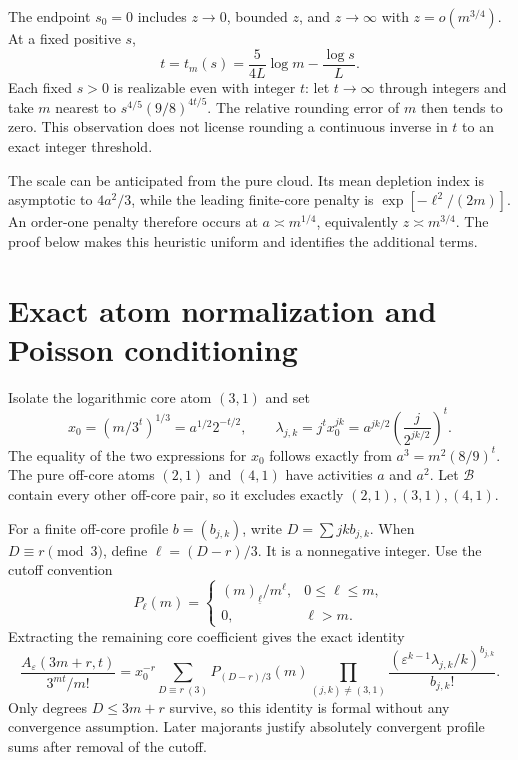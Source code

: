 \documentclass[11pt,letterpaper]{article}
\numberwithin{equation}{section}
\theoremstyle{definition}\newtheorem{definition}[theorem]{Definition}
\theoremstyle{remark}\newtheorem{remark}[theorem]{Remark}
\newcommand{\fall}[2]{(#1)_{\underline{#2}}}
\newcommand{\eps}{\varepsilon}
\newcommand{\Bad}{\mathcal B}
\begin{document}
The endpoint $s_0=0$ includes $z\to0$, bounded $z$, and $z\to\infty$
with $z=o(m^{3/4})$. At a fixed positive $s$,
\begin{equation}\label{det:grow:eq:t-of-s}
 t=t_m(s)=\frac{5}{4L}\log m-\frac{\log s}{L}.
\end{equation}
Each fixed $s>0$ is realizable even with integer $t$: let $t\to\infty$
through integers and take $m$ nearest to $s^{4/5}(9/8)^{4t/5}$.
The relative rounding error of $m$ then tends to zero. This observation
does not license rounding a continuous inverse in $t$ to an exact
integer threshold.

The scale can be anticipated from the pure cloud. Its mean depletion
index is asymptotic to $4a^2/3$, while the leading finite-core penalty is
$\exp[-\ell^2/(2m)]$. An order-one penalty therefore occurs at
$a\asymp m^{1/4}$, equivalently $z\asymp m^{3/4}$. The proof below
makes this heuristic uniform and identifies the additional terms.

\section{Exact atom normalization and Poisson conditioning}
Isolate the logarithmic core atom $(3,1)$ and set
\begin{equation}\label{det:grow:eq:activities}
 x_0=(m/3^t)^{1/3}=a^{1/2}2^{-t/2},\qquad
 \lambda_{j,k}=j^t x_0^{jk}
 =a^{jk/2}\left(\frac{j}{2^{jk/2}}\right)^t.
\end{equation}
The equality of the two expressions for $x_0$ follows exactly from
$a^3=m^2(8/9)^t$. The pure off-core atoms $(2,1)$ and $(4,1)$ have
activities $a$ and $a^2$. Let $\Bad$ contain every other off-core pair,
so it excludes exactly $(2,1),(3,1),(4,1)$.

For a finite off-core profile $b=(b_{j,k})$, write
$D=\sum jk b_{j,k}$. When $D\equiv r\pmod3$, define
$\ell=(D-r)/3$. It is a nonnegative integer. Use the cutoff convention
\begin{equation}\label{det:grow:eq:P}
 P_\ell(m)=\begin{cases}
 \fall{m}{\ell}/m^\ell,&0\le\ell\le m,\\
 0,&\ell>m.
 \end{cases}
\end{equation}
Extracting the remaining core coefficient gives the exact identity
\begin{equation}\label{det:grow:eq:profile}
 \frac{A_\eps(3m+r,t)}{3^{mt}/m!}
 =x_0^{-r}\sum_{D\equiv r\ (3)}P_{(D-r)/3}(m)
 \prod_{(j,k)\ne(3,1)}
 \frac{(\eps^{k-1}\lambda_{j,k}/k)^{b_{j,k}}}{b_{j,k}!}.
\end{equation}
Only degrees $D\le3m+r$ survive, so this identity is formal without
any convergence assumption. Later majorants justify absolutely
convergent profile sums after removal of the cutoff.
\end{document}
